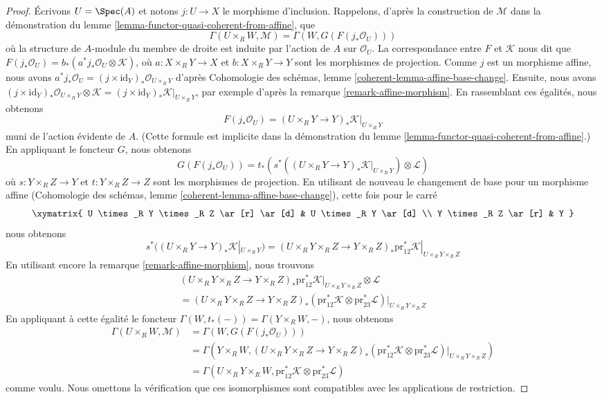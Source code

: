 \begin{proof}
\medskip\noindent
Écrivons $U = \Spec(A)$ et notons $j : U \to X$ le morphisme d'inclusion.
Rappelons, d'après la construction de $\mathcal{M}$ dans la démonstration du
lemme \ref{lemma-functor-quasi-coherent-from-affine}, que
$$
\Gamma(U \times_R W, \mathcal{M}) =
\Gamma(W, G(F(j_*\mathcal{O}_U)))
$$
où la structure de $A$-module du membre de droite est induite par
l'action de $A$ sur $\mathcal{O}_U$. La correspondance entre
$F$ et $\mathcal{K}$ nous dit que
$F(j_*\mathcal{O}_U) = b_*(a^*j_*\mathcal{O}_U \otimes \mathcal{K})$,
où $a : X \times_R Y \to X$ et $b : X \times_R Y \to Y$ sont
les morphismes de projection. Comme $j$ est un morphisme affine, nous avons
$a^*j_*\mathcal{O}_U = (j \times \text{id}_Y)_*\mathcal{O}_{U \times_R Y}$
d'après Cohomologie des schémas, lemme
\ref{coherent-lemma-affine-base-change}.
Ensuite, nous avons
$(j \times \text{id}_Y)_*\mathcal{O}_{U \times_R Y} \otimes \mathcal{K} =
(j \times \text{id}_Y)_*\mathcal{K}|_{U \times_R Y}$,
par exemple d'après la remarque \ref{remark-affine-morphism}.
En rassemblant ces égalités, nous obtenons
$$
F(j_*\mathcal{O}_U) =
(U \times_R Y \to Y)_*\mathcal{K}|_{U \times_R Y}
$$
muni de l'action évidente de $A$. (Cette formule est implicite dans la
démonstration du lemme \ref{lemma-functor-quasi-coherent-from-affine}.)
En appliquant le foncteur $G$, nous obtenons
$$
G(F(j_*\mathcal{O}_U)) =
t_*(s^*((U \times_R Y \to Y)_*\mathcal{K}|_{U \times_R Y})
\otimes \mathcal{L})
$$
où $s : Y \times_R Z \to Y$ et $t : Y \times_R Z \to Z$ sont
les morphismes de projection. En utilisant de nouveau le changement de base
pour un morphisme affine (Cohomologie des schémas, lemme
\ref{coherent-lemma-affine-base-change}), cette fois pour le carré
$$
\xymatrix{
U \times_R Y \times_R Z \ar[r] \ar[d] & U \times_R Y \ar[d] \\
Y \times_R Z \ar[r] & Y
}
$$
nous obtenons
$$
s^*((U \times_R Y \to Y)_*\mathcal{K}|_{U \times_R Y}) =
(U \times_R Y \times_R Z \to Y \times_R Z)_*
\text{pr}_{12}^*\mathcal{K}|_{U \times_R Y \times_R Z}
$$
En utilisant encore la remarque \ref{remark-affine-morphism}, nous trouvons
\begin{align*}
(U \times_R Y \times_R Z \to Y \times_R Z)_*
\text{pr}_{12}^*\mathcal{K}|_{U \times_R Y \times_R Z}
\otimes \mathcal{L} \\
=
(U \times_R Y \times_R Z \to Y \times_R Z)_*
\left(\text{pr}_{12}^*\mathcal{K} \otimes
\text{pr}_{23}^*\mathcal{L}\right)|_{U \times_R Y \times_R Z}
\end{align*}
En appliquant à cette égalité le foncteur
$\Gamma(W, t_*(-)) = \Gamma(Y \times_R W, -)$, nous obtenons
\begin{align*}
\Gamma(U \times_R W, \mathcal{M})
& =
\Gamma(W, G(F(j_*\mathcal{O}_U))) \\
& =
\Gamma(Y \times_R W, (U \times_R Y \times_R Z \to Y \times_R Z)_*
(\text{pr}_{12}^*\mathcal{K} \otimes
\text{pr}_{23}^*\mathcal{L})|_{U \times_R Y \times_R Z}) \\
& =
\Gamma(U \times_R Y \times_R W,
\text{pr}_{12}^*\mathcal{K} \otimes \text{pr}_{23}^*\mathcal{L})
\end{align*}
comme voulu. Nous omettons la vérification que ces isomorphismes sont
compatibles avec les applications de restriction.
\end{proof}

